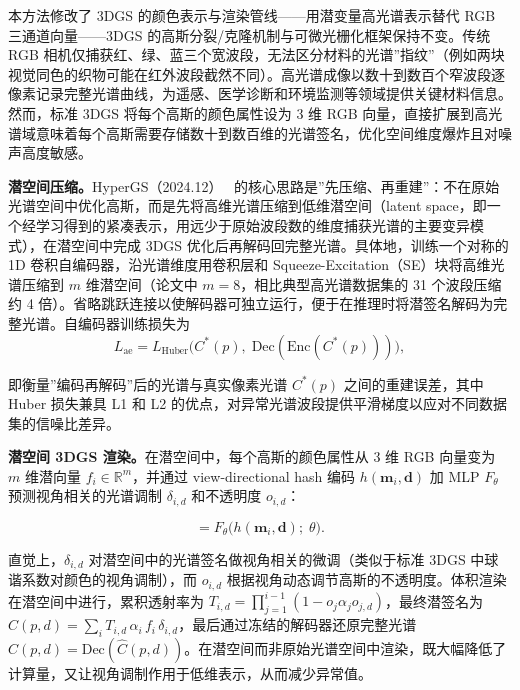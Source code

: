 本方法修改了 3DGS 的颜色表示与渲染管线——用潜变量高光谱表示替代 RGB 三通道向量——3DGS 的高斯分裂/克隆机制与可微光栅化框架保持不变。传统 RGB 相机仅捕获红、绿、蓝三个宽波段，无法区分材料的光谱”指纹”（例如两块视觉同色的织物可能在红外波段截然不同）。高光谱成像以数十到数百个窄波段逐像素记录完整光谱曲线，为遥感、医学诊断和环境监测等领域提供关键材料信息。然而，标准 3DGS 将每个高斯的颜色属性设为 3 维 RGB 向量，直接扩展到高光谱域意味着每个高斯需要存储数十到数百维的光谱签名，优化空间维度爆炸且对噪声高度敏感。

\textbf{潜空间压缩。}HyperGS（2024.12）~\cite{2412_12849} 的核心思路是”先压缩、再重建”：不在原始光谱空间中优化高斯，而是先将高维光谱压缩到低维潜空间（latent space，即一个经学习得到的紧凑表示，用远少于原始波段数的维度捕获光谱的主要变异模式），在潜空间中完成 3DGS 优化后再解码回完整光谱。具体地，训练一个对称的 1D 卷积自编码器，沿光谱维度用卷积层和 Squeeze-Excitation（SE）块将高维光谱压缩到 $m$ 维潜空间（论文中 $m{=}8$，相比典型高光谱数据集的 31 个波段压缩约 4 倍）。省略跳跃连接以使解码器可独立运行，便于在推理时将潜签名解码为完整光谱。自编码器训练损失为
\begin{equation}
L_{\text{ae}} = L_{\text{Huber}}\bigl(C^*(p),\; \text{Dec}(\text{Enc}(C^*(p)))\bigr),
\end{equation}

即衡量”编码再解码”后的光谱与真实像素光谱 $C^*(p)$ 之间的重建误差，其中 Huber 损失兼具 L1 和 L2 的优点，对异常光谱波段提供平滑梯度以应对不同数据集的信噪比差异。

\textbf{潜空间 3DGS 渲染。}在潜空间中，每个高斯的颜色属性从 3 维 RGB 向量变为 $m$ 维潜向量 $f_i \in \mathbb{R}^m$，并通过 view-directional hash 编码 $h(\mathbf{m}_i, \mathbf{d})$ 加 MLP $F_\theta$ 预测视角相关的光谱调制 $\delta_{i,d}$ 和不透明度 $o_{i,d}$：

\begin{equation}
[\delta_{i,d},\; o_{i,d}] = F_\theta\bigl(h(\mathbf{m}_i, \mathbf{d});\; \theta\bigr).
\end{equation}

直觉上，$\delta_{i,d}$ 对潜空间中的光谱签名做视角相关的微调（类似于标准 3DGS 中球谐系数对颜色的视角调制），而 $o_{i,d}$ 根据视角动态调节高斯的不透明度。体积渲染在潜空间中进行，累积透射率为 $T_{i,d} = \prod_{j=1}^{i-1}(1 - o_j \alpha_j o_{j,d})$，最终潜签名为 $\hat{C}(p,d) = \sum_i T_{i,d} \, \alpha_i \, f_i \, \delta_{i,d}$，最后通过冻结的解码器还原完整光谱 $C(p,d) = \text{Dec}(\hat{C}(p,d))$。在潜空间而非原始光谱空间中渲染，既大幅降低了计算量，又让视角调制作用于低维表示，从而减少异常值。

